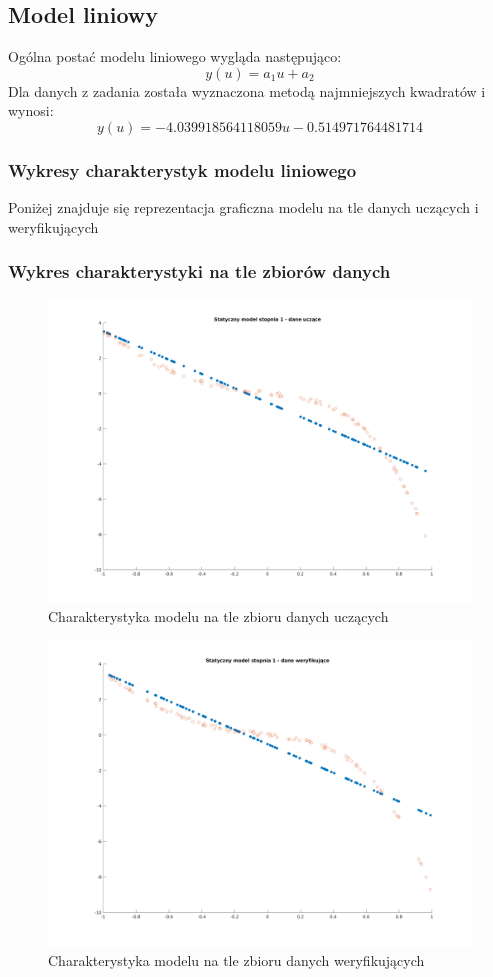 \documentclass[a4paper, 11pt]{article}
\begin{document}
\subsection{Model liniowy}
Ogólna postać modelu liniowego wygląda następująco: 
$$y(u) = a_1u + a_2$$
Dla danych z zadania została wyznaczona metodą najmniejszych kwadratów i wynosi: 
$$y(u) =-4.039918564118059u -0.514971764481714  $$

\subsubsection{Wykresy charakterystyk modelu liniowego}
Poniżej znajduje się reprezentacja graficzna modelu na tle danych uczących i weryfikujących 
\subsubsection{Wykres charakterystyki na tle zbiorów danych}
\begin{figure}[H]
\centering
\includegraphics[scale=0.50]{dane_stat_1_ucz.png}
\caption{Charakterystyka modelu na tle zbioru danych uczących}
\label{}
\end{figure}
\begin{figure}[H]
\centering
\includegraphics[scale=0.50]{dane_stat_1_wer.png}
\caption{Charakterystyka modelu na tle zbioru danych weryfikujących }
\label{}
\end{figure}
\end{document}
